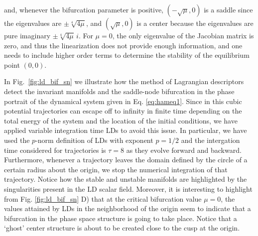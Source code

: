 \documentclass[8pt]{article}
\begin{document}
and, whenever the bifurcation parameter is positive, $(-\sqrt{\mu},0)$ is a saddle since the eigenvalues are $\pm \sqrt[4]{4\mu}$, and $(\sqrt{\mu},0)$ is a center because the eigenvalues are pure imaginary $\pm \sqrt[4]{4\mu} \, i$. For $\mu = 0$, the only eigenvalue of the Jacobian matrix is zero, and thus the linearization does not provide enough information, and one needs to include higher order terms to determine the stability of the equilibrium point $(0,0)$.

\smallskip

In Fig.~\ref{fig:ld_bif_sn} we illustrate how the method of Lagrangian descriptors detect the invariant manifolds and the saddle-node bifurcation in the phase portrait of the dynamical system given in Eq. \eqref{eq:hameq1}. Since in this cubic potential trajectories can escape off to infinity in finite time depending on the total energy of the system and the location of the initial conditions, we have applied variable integration time LDs to avoid this issue. In particular, we have used the $p$-norm definition of LDs with exponent $p = 1/2$ and the intergation time considered for trajectories is $\tau = 8$ as they evolve forward and backward. Furthermore, whenever a trajectory leaves the domain defined by the circle of a certain radius about the origin, we stop the numerical integration of that trajectory. Notice how the stable and unstable manifolds are highlighted by the singularities present in the LD scalar field. Moreover, it is interesting to highlight from Fig. \ref{fig:ld_bif_sn} D) that at the critical bifurcation value $\mu = 0$, the values attained by LDs in the neighborhood of the origin seem to indicate that a bifurcation in the phase space structure is going to take place. Notice that a `ghost' center structure is about to be created close to the cusp at the origin.
\end{document}

